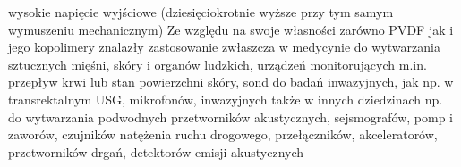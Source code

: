 wysokie napięcie wyjściowe (dziesięciokrotnie wyższe przy tym samym wymuszeniu 
mechanicznym) \cite{nasa}
Ze względu na swoje własności zarówno PVDF jak i jego kopolimery znalazły zastosowanie 
zwłaszcza w medycynie do wytwarzania sztucznych mięśni, skóry i organów ludzkich, 
urządzeń monitorujących m.in. przepływ krwi lub stan powierzchni skóry, sond do badań 
inwazyjnych, jak np. w transrektalnym USG, mikrofonów, inwazyjnych także w innych 
dziedzinach np. do wytwarzania podwodnych przetworników akustycznych, sejsmografów, 
pomp i zaworów, czujników natężenia ruchu drogowego, przełączników, akceleratorów, 
przetworników drgań, detektorów emisji akustycznych \cite{shock}

